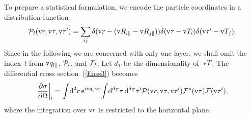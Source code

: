 To prepare a statistical formulation,
we encode the particle coordinates in a distribution function
%
%
%
\begin{equation}\label{EPDdeltas}
  \mathcal{P}_{l}(\text{v}{r},\text{v}\tau,\text{v}\tau')
  = \sum_{ij} \delta(\text{v}{r}-(\text{v}{R}_{i\parallel}-\text{v}{R}_{j\parallel}))
  \delta(\text{v}\tau-\text{v}{T}_i)\delta(\text{v}\tau'-\text{v}{T}_j).
\end{equation}
Since in the following we are concerned with only one layer,
we shall omit the index~$l$ from $\text{v}{q}_{l\parallel}$, $\mathcal{P}_l$, and $\mathcal{F}_l$.
Let $d_T$ be the dimensionality of~$\text{v}{T}$.
The differential cross section~(\ref{Eass3}) becomes
\begin{equation}\label{Epdm1}
  \left.\frac{\partial\sigma}{\partial\Omega}\right|_l
  =
  \int\!\text{d}^2r\,   \text{e}^{i\text{v}{q}_{\parallel}\text{v}{r}}\!
  \int\! \text{d}^{d_T}\tau\, \text{d}^{d_T}\tau'
    \mathcal{P}(\text{v}{r},\text{v}\tau,\text{v}\tau')
    \mathcal{F}^*(\text{v}\tau) \mathcal{F}(\text{v}\tau'),
\end{equation}
where the integration over $\text{v}{r}$ is restricted to the horizontal plane.

